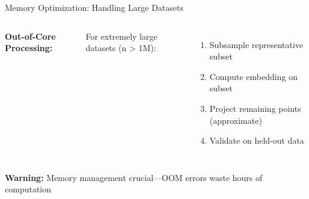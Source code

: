 \documentclass[aspectratio=169]{beamer}
\newcommand{\warning}[1]{\colorbox{red!10}{\textcolor{warningcolor}{\textbf{Warning:} #1}}}
\begin{document}
\begin{frame}{Memory Optimization: Handling Large Datasets}
\begin{columns}

\vspace{0.2cm}
\textbf{Out-of-Core Processing:}

For extremely large datasets (n > 1M):
\begin{enumerate}
\item Subsample representative subset
\item Compute embedding on subset
\item Project remaining points (approximate)
\item Validate on held-out data
\end{enumerate}
\end{columns}

\vspace{0.3cm}
\warning{Memory management crucial—OOM errors waste hours of computation}
\end{frame}
\end{document}
